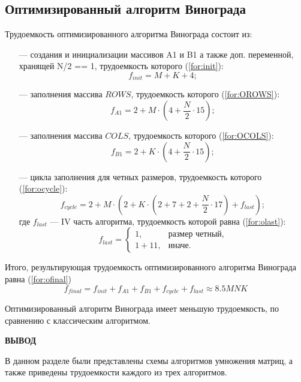 \subsection{Оптимизированный алгоритм Винограда}
Трудоемкость оптимизированного алгоритма Винограда состоит из:
\begin{itemize}
	\item[---] создания и инициализации массивов A1 и B1 а также доп. переменной, хранящей N/2 == 1, трудоемкость которого (\ref{for:init}):
	\begin{equation}
		\label{for:init}
		f_{init} = M + K + 4;
	\end{equation}
	
	\item[---] заполнения массива $ROWS$, трудоемкость которого (\ref{for:OROWS}):
	\begin{equation}
		\label{for:OROWS}
		f_{A1} = 2 + M \cdot (4 + \frac{N}{2} \cdot 15);
	\end{equation}
	
	\item[---] заполнения массива $COLS$, трудоемкость которого (\ref{for:OCOLS}):
	\begin{equation}
		\label{for:OCOLS}
		f_{B1} = 2 + K \cdot (4 + \frac{N}{2} \cdot 15);
	\end{equation}
	
	\item[---] цикла заполнения для четных размеров, трудоемкость которого (\ref{for:ocycle}):
	\begin{equation}
		\label{for:ocycle}
		f_{cycle} = 2 + M \cdot (2 + K \cdot (2 + 7 + 2 + \frac{N}{2} \cdot 17) + f_{last});		
	\end{equation}
	где $f_{last}$ --- IV часть алгоритма, трудоемкость которой равна (\ref{for:olast}):
	\begin{equation}
		\label{for:olast}
		f_{last} = \begin{cases}
			1, & \text{размер четный,}\\
			1 + 11, & \text{иначе.}
		\end{cases}
	\end{equation}
\end{itemize}

Итого, результирующая трудоемкость оптимизированного алгоритма Винограда равна (\ref{for:ofinal})
\begin{equation}
	\label{for:ofinal}
	f_{final} = f_{init} + f_{A1} + f_{B1} + f_{cycle} + f_{last} \approx 8.5MNK
\end{equation}

Оптимизированный алгоритм Винограда имеет меньшую трудоемкость, по сравнению с классическим алгоритмом.

\vspace{5mm}

\textbf{ВЫВОД}

 В данном разделе были представлены схемы алгоритмов умножения матриц, а также приведены трудоемкости каждого из трех алгоритмов.

\clearpage